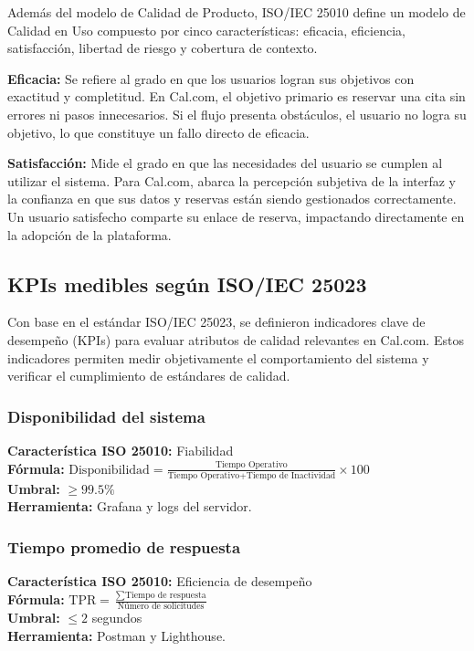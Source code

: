 \documentclass{article}
\begin{document}
Además del modelo de Calidad de Producto, ISO/IEC 25010 define un modelo de Calidad en Uso compuesto por cinco características: eficacia, eficiencia, satisfacción, libertad de riesgo y cobertura de contexto.

\textbf{Eficacia:} Se refiere al grado en que los usuarios logran sus objetivos con exactitud y completitud. En Cal.com, el objetivo primario es reservar una cita sin errores ni pasos innecesarios. Si el flujo presenta obstáculos, el usuario no logra su objetivo, lo que constituye un fallo directo de eficacia.

\textbf{Satisfacción:} Mide el grado en que las necesidades del usuario se cumplen al utilizar el sistema. Para Cal.com, abarca la percepción subjetiva de la interfaz y la confianza en que sus datos y reservas están siendo gestionados correctamente. Un usuario satisfecho comparte su enlace de reserva, impactando directamente en la adopción de la plataforma.

\subsection{KPIs medibles según ISO/IEC 25023}

Con base en el estándar ISO/IEC 25023, se definieron indicadores clave de desempeño (KPIs) para evaluar atributos de calidad relevantes en Cal.com. Estos indicadores permiten medir objetivamente el comportamiento del sistema y verificar el cumplimiento de estándares de calidad.

\subsubsection{Disponibilidad del sistema}
\textbf{Característica ISO 25010:} Fiabilidad\\
\textbf{Fórmula:} $\text{Disponibilidad} = \frac{\text{Tiempo Operativo}}{\text{Tiempo Operativo} + \text{Tiempo de Inactividad}} \times 100$\\
\textbf{Umbral:} $\geq 99.5\%$\\
\textbf{Herramienta:} Grafana y logs del servidor.

\subsubsection{Tiempo promedio de respuesta}
\textbf{Característica ISO 25010:} Eficiencia de desempeño\\
\textbf{Fórmula:} $\text{TPR} = \frac{\sum \text{Tiempo de respuesta}}{\text{Número de solicitudes}}$\\
\textbf{Umbral:} $\leq 2$ segundos\\
\textbf{Herramienta:} Postman y Lighthouse.
\end{document}
